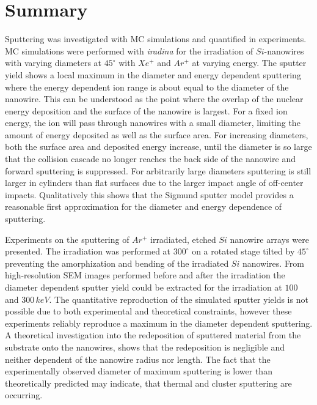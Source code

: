 \section{Summary}

Sputtering was investigated with MC simulations and quantified in experiments. MC simulations were performed with \emph{iradina} for the irradiation of $Si$-nanowires with varying diameters at $45^\circ$ with $Xe^+$ and $Ar^+$ at varying energy. The sputter yield shows a local maximum in the diameter and energy dependent sputtering where the energy dependent ion range is about equal to the diameter of the nanowire. This can be understood as the point where the overlap of the nuclear energy deposition and the surface of the nanowire is largest. For a fixed ion energy, the ion will pass through nanowires with a small diameter, limiting the amount of energy deposited as well as the surface area. For increasing diameters, both the surface area and deposited energy increase, until the diameter is so large that the collision cascade no longer reaches the back side of the nanowire and forward sputtering is suppressed. For arbitrarily large diameters sputtering is still larger in cylinders than flat surfaces due to the larger impact angle of off-center impacts. Qualitatively this shows that the Sigmund sputter model provides a reasonable first approximation for the diameter and energy dependence of sputtering.
 
Experiments on the sputtering of $Ar^+$ irradiated, etched $Si$ nanowire arrays were presented. The irradiation was performed at $300^\circ$ on a rotated stage tilted by $45^\circ$ preventing the amorphization and bending of the irradiated $Si$ nanowires. From high-resolution SEM images performed before and after the irradiation the diameter dependent sputter yield could be extracted for the irradiation at $100$ and $300\,keV$. The quantitative reproduction of the simulated sputter yields is not possible due to both experimental and theoretical constraints, however these experiments reliably reproduce a maximum in the diameter dependent sputtering. A theoretical investigation into the redeposition of sputtered material from the substrate onto the nanowires, shows that the redeposition is negligible and neither dependent of the nanowire radius nor length. The fact that the experimentally observed diameter of maximum sputtering is lower than theoretically predicted may indicate, that thermal and cluster sputtering are occurring.

